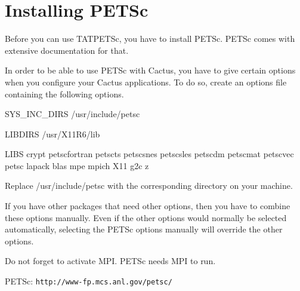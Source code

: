 \documentclass[12pt]{article}
\begin{document}
\section{Installing PETSc}

Before you can use TATPETSc, you have to install PETSc.  PETSc comes
with extensive documentation for that.

In order to be able to use PETSc with Cactus, you have to give certain
options when you configure your Cactus applications.  To do so, create
an options file containing the following options.

\begin{description}
   \item{SYS\_INC\_DIRS} /usr/include/petsc

   \item{LIBDIRS} /usr/X11R6/lib

   \item{LIBS} crypt petscfortran petscts petscsnes petscsles petscdm
   petscmat petscvec petsc lapack blas mpe mpich X11 g2c z
\end{description}

Replace /usr/include/petsc with the corresponding directory on your
machine.

If you have other packages that need other options, then you have to
combine these options manually.  Even if the other options would
normally be selected automatically, selecting the PETSc options
manually will override the other options.

Do not forget to activate MPI.  PETSc needs MPI to run.

\begin{thebibliography}{99}
    PETSc:
   \verb+http://www-fp.mcs.anl.gov/petsc/+
\end{thebibliography}
\end{document}

